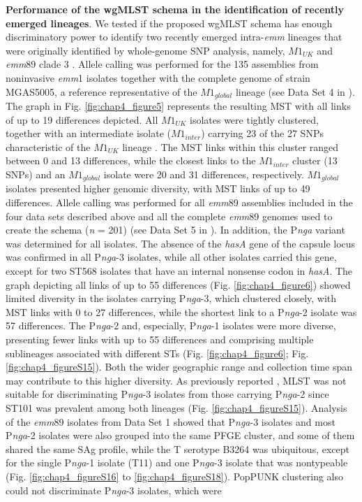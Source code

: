 \textbf{Performance of the wgMLST schema in the identiﬁcation of recently emerged lineages}. We tested if the proposed \ac{wgMLST} schema has enough discriminatory power to identify two recently emerged intra-\textit{emm} lineages that were originally identiﬁed by whole-genome \ac{SNP} analysis, namely, $M1_{UK}$ and \textit{emm}89 clade 3 \cite{turner_emergence_2015, zhu_molecular_2015, lynskey_emergence_2019}. Allele calling was performed for the 135 assemblies from noninvasive \textit{emm}1 isolates \cite{lynskey_emergence_2019} together with the complete genome of strain MGAS5005, a reference representative of the $M1_{global}$ lineage (see Data Set 4 in \cite{friaes_supplemental_2023}). The graph in Fig. \ref{fig:chap4_figure5} represents the resulting \ac{MST} with all links of up to 19 differences depicted. All $M1_{UK}$ isolates were tightly clustered, together with an intermediate isolate ($M1_{inter}$) carrying 23 of the 27 \ac{SNP}s characteristic of the $M1_{UK}$ lineage \cite{lynskey_emergence_2019}. The \ac{MST} links within this cluster ranged between 0 and 13 differences, while the closest links to the $M1_{inter}$ cluster (13 \ac{SNP}s) and an $M1_{global}$ isolate were 20 and 31 differences, respectively. $M1_{global}$ isolates presented higher genomic diversity, with \ac{MST} links of up to 49 differences. Allele calling was performed for all \textit{emm}89 assemblies included in the four data sets described above and all the complete \textit{emm}89 genomes used to create the schema (\textit{n} = 201) (see Data Set 5 in \cite{friaes_supplemental_2023}). In addition, the P\textit{nga} variant was determined for all isolates. The absence of the \textit{hasA} gene of the capsule locus was conﬁrmed in all P\textit{nga}-3 isolates, while all other isolates carried this gene, except for two ST568 isolates that have an internal nonsense codon in \textit{hasA}. The graph depicting all links of up to 55 differences (Fig. \ref{fig:chap4_figure6}) showed limited diversity in the isolates carrying P\textit{nga}-3, which clustered closely, with \ac{MST} links with 0 to 27 differences, while the shortest link to a P\textit{nga}-2 isolate was 57 differences. The P\textit{nga}-2 and, especially, P\textit{nga}-1 isolates were more diverse, presenting fewer links with up to 55 differences and comprising multiple sublineages associated with different \ac{ST}s (Fig. \ref{fig:chap4_figure6}; Fig. \ref{fig:chap4_figureS15}). Both the wider geographic range and collection time span may contribute to this higher diversity. As previously reported \cite{friaes_emergence_2015}, \ac{MLST} was not suitable for discriminating P\textit{nga}-3 isolates from those carrying P\textit{nga}-2 since ST101 was prevalent among both lineages (Fig. \ref{fig:chap4_figureS15}). Analysis of the \textit{emm}89 isolates from Data Set 1 showed that P\textit{nga}-3 isolates and most P\textit{nga}-2 isolates were also grouped into the same \ac{PFGE} cluster, and some of them shared the same SAg proﬁle, while the T serotype B3264 was ubiquitous, except for the single P\textit{nga}-1 isolate (T11) and one P\textit{nga}-3 isolate that was nontypeable (Fig. \ref{fig:chap4_figureS16} to \ref{fig:chap4_figureS18}). \ac{PopPUNK} clustering also could not discriminate P\textit{nga}-3 isolates, which were 